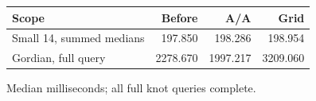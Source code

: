\begin{center}\small
\begin{tabular}{@{}lrrr@{}}
\toprule
Scope & Before & A/A & Grid \\
\midrule
Small 14, summed medians & 197.850 & 198.286 & 198.954 \\
Gordian, full query & 2278.670 & 1997.217 & 3209.060 \\
\bottomrule
\end{tabular}
\end{center}
Median milliseconds; all full knot queries complete.

